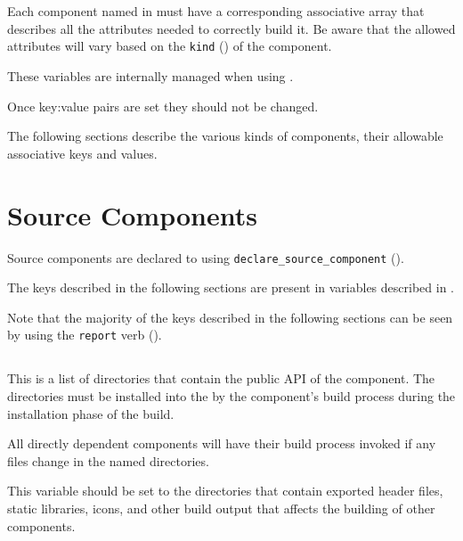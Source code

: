 \section{}\label{variables:lmsbw-component-component}

Each component named in \lmsbwcomponents must have a corresponding
associative array that describes all the attributes needed to
correctly build it.  Be aware that the allowed attributes will vary
based on the \texttt{kind} () of the component.

These variables are internally managed when using \lmsbw.

Once key:value pairs are set they should not be changed.

The following sections describe the various kinds of components, their
allowable associative keys and values.

\section{Source Components}

Source components are declared to \lmsbw using
\texttt{declare\_source\_component}
().

The keys described in the following sections are present in variables
described in .

Note that the majority of the keys described in the following sections
can be seen by using the \texttt{report} verb
().


\subsection{}\label{variables:api}

This is a list of directories that contain the public API of the
component.  The directories must be installed into the \destdir by the
component's build process during the installation phase of the build.

All directly dependent components will have their build process
invoked if any files change in the named directories.

This variable should be set to the directories that contain exported
header files, static libraries, icons, and other build output that
affects the building of other components.

